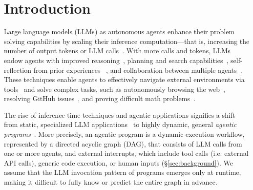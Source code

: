 \section{Introduction}
\label{sec:intro}


Large language models (LLMs) as autonomous agents enhance their problem solving capabilities by scaling their inference computation—that is, increasing the number of output tokens or LLM calls~\cite{Evans1984-EVAHAA, Kahneman:2011fj, 01670ebe-b3af-3829-a929-8f19529d1afb, snell2024scalingllmtesttimecompute, chen2024llmcallsneedscaling, brown2024largelanguagemonkeysscaling}. With more calls and tokens, LLMs endow agents with improved reasoning~\cite{wei2023chainofthoughtpromptingelicitsreasoning, yao2023treethoughtsdeliberateproblem, yao2023reactsynergizingreasoningacting,deepseekai2025deepseekr1incentivizingreasoningcapability}, planning and search capabilities~\cite{zhou2024languageagenttreesearch, putta2024agentqadvancedreasoning}, self-reflection from prior experiences ~\cite{shinn2023reflexionlanguageagentsverbal, yu2024exactteachingaiagents, kumar2024traininglanguagemodelsselfcorrect}, and collaboration between multiple agents~\cite{du2023improvingfactualityreasoninglanguage, wu2023autogenenablingnextgenllm, zhuge2024languageagentsoptimizablegraphs}. These techniques enable agents to effectively navigate external environments via tools~\cite{schick2023toolformerlanguagemodelsteach, patil2023gorillalargelanguagemodel, yao2023reactsynergizingreasoningacting} and solve complex tasks, such as autonomously browsing the web~\cite{yao2023webshopscalablerealworldweb, zhou2024webarenarealisticwebenvironment, gur2024realworldwebagentplanninglong}, resolving GitHub issues~\cite{jimenez2024swebench, yang2024sweagentagentcomputerinterfacesenable, wang2024openhandsopenplatformai}, and proving difficult math problems~\cite{deepmind_imo_silver_2024, kumarappan2024leanagentlifelonglearningformal}. 





The rise of inference-time techniques and agentic applications signifies a shift from static, specialized LLM applications~\cite{langchain, lin2024parrotefficientservingllmbased} to highly dynamic, general \textit{agentic programs}~\cite{zheng2024sglangefficientexecutionstructured,wu2023autogenenablingnextgenllm, langgraph}. More precisely, an agentic program is a dynamic execution workflow, represented by a directed acyclic graph (DAG), that consists of LLM calls from one or more agents, and external interrupts, which include tool calls (i.e. external API calls), generic code execution, or human inputs (\S\ref{sec:background}). We assume that the LLM invocation pattern of programs emerges only at runtime, making it difficult to fully know or predict the entire graph in advance.

